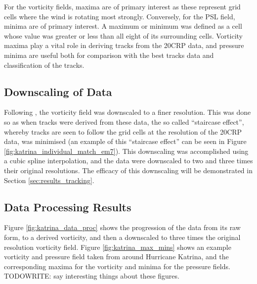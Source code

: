 \documentclass[pdftex,12pt,a4paper]{report}
\begin{document}
For the vorticity fields, maxima are of primary interest as these represent grid cells where the
wind is rotating most strongly. Conversely, for the PSL field, minima are of primary interest. A
maximum or minimum was defined as a cell whose value was greater or less than all eight of its
surrounding cells. Vorticity maxima play a vital role in deriving tracks from the 20CRP data, and
pressure minima are useful both for comparison with the best tracks data and classification of the
tracks.

\subsection{Downscaling of Data}

Following \textcite{TODOCITEhodgesXXX}, the vorticity field was downscaled to a finer resolution. This was
done so as when tracks were derived from these data, the so called ``staircase effect'', whereby
tracks are seen to follow the grid cells at the resolution of the 20CRP data, was minimised (an
example of this ``staircase effect'' can be seen in Figure \ref{fig:katrina_individual_match_em7}). This
downscaling was accomplished using a cubic spline interpolation, and the data were downscaled to two and
three times their original resolutions. The efficacy of this downscaling will be demonstrated in
Section \ref{sec:results_tracking}.

\subsection{Data Processing Results}

Figure \ref{fig:katrina_data_proc} shows the progression of the data from its raw form, to a derived
vorticity, and then a downscaled to three times the original resolution vorticity field. Figure
\ref{fig:katrina_max_mins} shows an example vorticity and pressure field taken from around Hurricane
Katrina, and the corresponding maxima for the vorticity and minima for the pressure fields.
TODOWRITE:
say interesting things about these figures.
\end{document}

